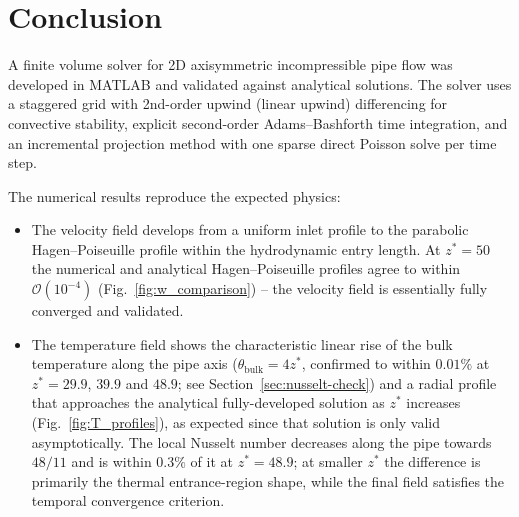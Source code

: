 \documentclass[12pt,a4paper]{article}
\begin{document}
\newpage

\section{Conclusion}

A finite volume solver for 2D axisymmetric incompressible pipe flow was developed in MATLAB and validated against analytical solutions.
The solver uses a staggered grid with 2nd-order upwind (linear upwind) differencing for convective stability, explicit second-order Adams--Bashforth time integration, and an incremental projection method with one sparse direct Poisson solve per time step.

The numerical results reproduce the expected physics:
\begin{itemize}
    \item The velocity field develops from a uniform inlet profile to the parabolic Hagen--Poiseuille profile within the hydrodynamic entry length. At $z^*=50$ the numerical and analytical
          Hagen--Poiseuille profiles agree to within $\mathcal{O}(10^{-4})$ (Fig.~\ref{fig:w_comparison}) -- the velocity field is essentially fully converged and validated.
    \item The temperature field shows the characteristic linear rise of the bulk temperature along the pipe axis ($\theta_{\text{bulk}}=4z^*$, confirmed to within $0.01\%$ at $z^*=29.9$, $39.9$ and $48.9$; see
          Section~\ref{sec:nusselt-check}) and a radial profile that approaches the analytical fully-developed solution as $z^*$ increases (Fig.~\ref{fig:T_profiles}), as expected since that solution
          is only valid asymptotically. The local Nusselt number decreases along the pipe towards $48/11$ and is within $0.3\%$ of it at $z^*=48.9$; at smaller $z^*$ the difference is primarily the thermal entrance-region shape, while the final field satisfies the temporal convergence criterion.
\end{itemize}

\newpage

\appendix


\label{app:derivation}
\end{document}
